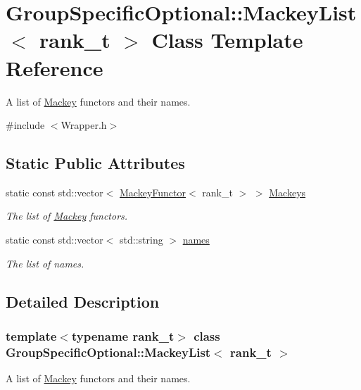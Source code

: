 \hypertarget{classGroupSpecificOptional_1_1MackeyList}{}\section{Group\+Specific\+Optional\+:\+:Mackey\+List$<$ rank\+\_\+t $>$ Class Template Reference}
\label{classGroupSpecificOptional_1_1MackeyList}


A list of \hyperlink{namespaceMackey}{Mackey} functors and their names.  




{\ttfamily \#include $<$Wrapper.\+h$>$}

\subsection*{Static Public Attributes}
\begin{DoxyCompactItemize}
\item 
static const std\+::vector$<$ \hyperlink{classMackey_1_1MackeyFunctor}{Mackey\+Functor}$<$ rank\+\_\+t $>$ $>$ \hyperlink{classGroupSpecificOptional_1_1MackeyList_aa15b7c7dbcccc2b30442f46aba42b776}{Mackeys}
\begin{DoxyCompactList}\small\item\em The list of \hyperlink{namespaceMackey}{Mackey} functors. \end{DoxyCompactList}\item 
static const std\+::vector$<$ std\+::string $>$ \hyperlink{classGroupSpecificOptional_1_1MackeyList_a8e25429ed075c31ace2b02bf72f5ef05}{names}
\begin{DoxyCompactList}\small\item\em The list of names. \end{DoxyCompactList}\end{DoxyCompactItemize}


\subsection{Detailed Description}
\subsubsection*{template$<$typename rank\+\_\+t$>$\newline
class Group\+Specific\+Optional\+::\+Mackey\+List$<$ rank\+\_\+t $>$}

A list of \hyperlink{namespaceMackey}{Mackey} functors and their names. 

